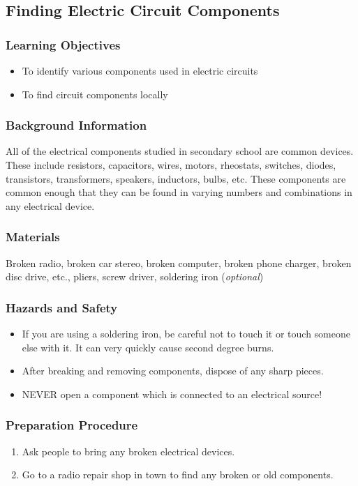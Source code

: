 
\subsection{Finding Electric Circuit Components}

\subsubsection*{Learning Objectives}
\begin{itemize}
\item{To identify various components used in electric circuits} 
\item{To find circuit components locally} 
\end{itemize}

\subsubsection*{Background Information}
All of the electrical components studied in secondary school are common devices. These include resistors, capacitors, wires, motors, rheostats, switches, diodes, transistors, transformers, speakers, inductors, bulbs, etc. These components are common enough that they can be found in varying numbers and combinations in any electrical device. 

\subsubsection*{Materials}
Broken radio, broken car stereo, broken computer, broken phone charger, broken disc drive, etc., pliers, screw driver, soldering iron (\textit{optional})

\subsubsection*{Hazards and Safety}
\begin{itemize}
\item{If you are using a soldering iron, be careful not to touch it or touch someone else with it. It can very quickly cause second degree burns.} 
\item{After breaking and removing components, dispose of any sharp pieces.} 
\item{NEVER open a component which is connected to an electrical source!} 
\end{itemize}

\subsubsection*{Preparation Procedure}
\begin{enumerate}
\item{Ask people to bring any broken electrical devices.} 
\item{Go to a radio repair shop in town to find any broken or old components.} 
\end{enumerate}

